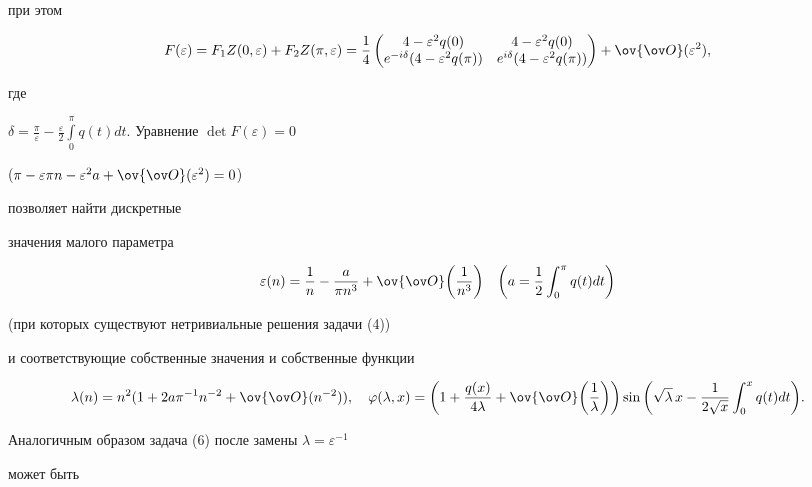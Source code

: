 при этом 


$$ 


F(\varepsilon)=F_1 Z(0,\varepsilon)+F_2 Z(\pi,\varepsilon)= 


\frac{1}{4} 


\begin{pmatrix} 


4-\varepsilon^2 q(0) & 4-\varepsilon^2 q(0) \\ 


e^{-i\delta}(4-\varepsilon^2 q(\pi)) & 


e^{i\delta}(4-\varepsilon^2 q(\pi)) 


\end{pmatrix} 


+\ov{\ov O}(\varepsilon^2), 


$$ 


где 


$\delta=\frac{\pi}{\varepsilon}-\frac{\varepsilon}{2} 


\int\limits^\pi_0 q(t)dt$. Уравнение $\det F(\varepsilon)=0$ 


($\pi-\varepsilon\pi n-\varepsilon^2a+\ov{\ov O}(\varepsilon^2)=0$) 


позволяет найти дискретные 


значения малого параметра 


$$ 


\varepsilon(n)=\frac{1}{n}-\frac{a}{\pi n^3}+ 


\ov{\ov O}\bigg(\frac{1}{n^3} \bigg)\quad 


\bigg(a=\frac{1}{2}\int^\pi_0 q(t)dt \bigg) 


$$ 


(при которых существуют нетривиальные решения задачи (4)) 


и соответствующие собственные значения и собственные функции 


$$ 


\lambda(n)=n^2(1+2a\pi^{-1}n^{-2}+\ov{\ov O}(n^{-2})),\quad 


\varphi(\lambda,x)=\bigg(1+\frac{q(x)}{4\lambda}+ 


\ov{\ov O}\bigg(\frac{1}{\lambda} \bigg) 


\bigg)\sin\bigg(\sqrt{\lambda}\,x-\frac{1}{2\sqrt{x}} 


\int^x_0 q(t)dt\bigg). 


$$ 


Аналогичным образом задача (6) после замены $\lambda=\varepsilon^{-1}$ 


может быть 


